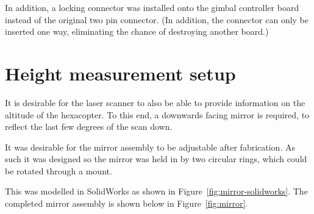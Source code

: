 \documentclass[12pt,oneside,a4paper]{book}
\begin{document}
In addition, a locking connector was installed onto the gimbal
controller board instead of the original two pin connector. (In
addition, the connector can only be inserted one way, eliminating the
chance of destroying another board.)

\section{Height measurement setup}
\label{sec:height-meas-setup}

It is desirable for the laser scanner to also be able to provide
information on the altitude of the hexacopter. To this end, a
downwards facing mirror is required, to reflect the last few degrees
of the scan down.

It was desirable for the mirror assembly to be adjustable after
fabrication. As such it was designed so the mirror was held in by two
circular rings, which could be rotated through a mount.

This was modelled in SolidWorks as shown in
Figure~\ref{fig:mirror-solidworks}. The completed mirror assembly is shown below in
Figure~\ref{fig:mirror}.
\end{document}

